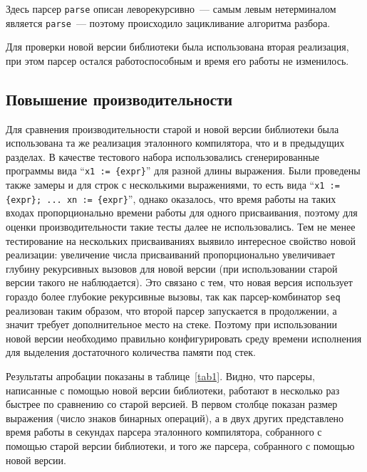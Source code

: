 \documentclass[conference]{IEEEtran}
\begin{document}
Здесь парсер \lstinline|parse| описан леворекурсивно~--- самым левым нетерминалом является \lstinline|parse|~--- поэтому происходило зацикливание алгоритма разбора. 

Для проверки новой версии библиотеки была использована вторая реализация, при этом парсер остался работоспособным и время его работы не изменилось.

\subsection{Повышение производительности}

Для сравнения производительности старой и новой версии библиотеки была использована та же реализация эталонного компилятора, что и в предыдущих разделах. В качестве тестового
набора использовались сгенерированные программы вида ``\lstinline|x1 := {expr}|'' для разной длины выражения.  Были проведены также замеры и для строк с несколькими
выражениями, то есть вида ``\lstinline|x1 := {expr}; ... xn := {expr}|'', однако оказалось, что время работы на таких входах пропорционально времени работы для одного присваивания,
поэтому для оценки производительности такие тесты далее не использовались. Тем не менее тестирование на нескольких присваиваниях выявило интересное свойство новой реализации:
увеличение числа присваиваний пропорционально увеличивает глубину рекурсивных вызовов для новой версии (при использовании старой версии такого не наблюдается). Это связано с тем,
что новая версия использует гораздо более глубокие рекурсивные вызовы, так как парсер-комбинатор \lstinline|seq| реализован таким образом, что второй парсер запускается в продолжении,
а значит требует дополнительное место на стеке. Поэтому при использовании новой версии необходимо правильно конфигурировать среду времени исполнения для выделения достаточного
количества памяти под стек.

Результаты апробации показаны в таблице~\ref{tab1}. Видно, что парсеры, написанные с помощью новой версии библиотеки, работают в несколько раз быстрее по сравнению со старой версией.
В первом столбце показан размер выражения (число знаков бинарных операций), а в двух других представлено время работы в секундах парсера эталонного компилятора, собранного с помощью старой версии библиотеки, и того же парсера, собранного с помощью новой версии.
\end{document}
